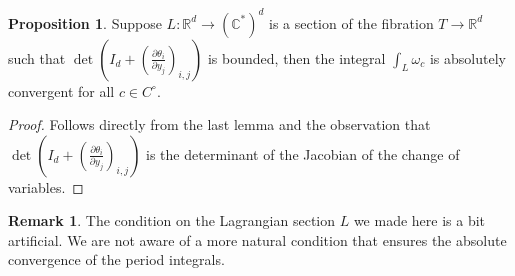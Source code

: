 \documentclass[11pt,reqno]{amsart}
\def\CC {{\mathbb C}}
\def\R {{\mathbb R}}
\theoremstyle{definition}
\newtheorem{proposition}[theorem]{Proposition}
\newtheorem{remark}[theorem]{Remark}
\numberwithin{equation}{section}
\begin{document}
\smallskip

\begin{proposition}\label{convergence_of_the_integral}
	Suppose $L:\R^d\rightarrow(\CC^*)^d$ is a section of the fibration $T\rightarrow \R^d$ such that $\det( I_d+\left(\frac{\partial\theta_i}{\partial y_j}\right)_{i,j} )$ is bounded, then the integral $\int_{L}\omega_c$ is absolutely convergent for all $c\in C^{\circ}$.
\end{proposition}
\begin{proof}
	Follows directly from the last lemma and the observation that $\det( I_d+\left(\frac{\partial\theta_i}{\partial y_j}\right)_{i,j} )$ is the determinant of the Jacobian of the change of variables.
\end{proof}

\smallskip

\begin{remark}
	The condition on the Lagrangian section $L$ we made here is a bit artificial. We are not aware of a more natural condition that ensures the absolute convergence of the period integrals. 
\end{remark}

\smallskip
\end{document}
